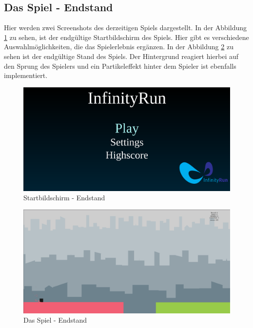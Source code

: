 \subsection{Das Spiel - Endstand}
Hier werden zwei Screenshots des derzeitigen Spiels dargestellt. In der Abbildung \ref{pic:startende} zu sehen, ist der endgültige Startbildschirm des Spiels. Hier gibt es verschiedene Auswahlmöglichkeiten, die das Spielerlebnis ergänzen. In der Abbildung \ref{pic:spielende} zu sehen ist der endgültige Stand des Spiels. Der Hintergrund reagiert hierbei auf den Sprung des Spielers und ein Partikeleffekt hinter dem Spieler ist ebenfalls implementiert.
\begin{figure}[htb]
	\centering
	\includegraphics[scale=0.22]{content/pictures/startende.png}
	\caption{Startbildschirm - Endstand}
	\label{pic:startende}
\end{figure}
\begin{figure}[htb]
	\centering
	\includegraphics[scale=0.22]{content/pictures/spielende.png}
	\caption{Das Spiel - Endstand}
	\label{pic:spielende}
\end{figure}
\newpage
